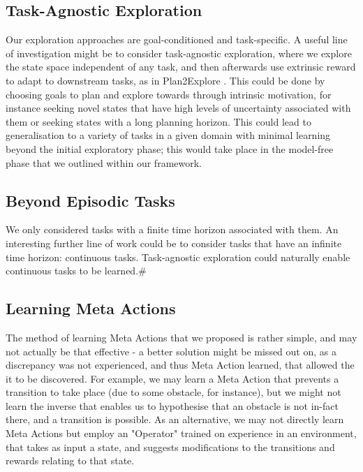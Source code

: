 \subsection{Task-Agnostic Exploration}
Our exploration approaches are goal-conditioned and task-specific. A useful line of investigation might be to consider task-agnostic exploration, where we explore the state space independent of any task, and then afterwards use extrinsic reward to adapt to downstream tasks, as in Plan2Explore \cite{plan2explore}. This could be done by choosing goals to plan and explore towards through intrinsic motivation, for instance seeking novel states that have high levels of uncertainty associated with them or seeking states with a long planning horizon. This could lead to generalisation to a variety of tasks in a given domain with minimal learning beyond the initial exploratory phase; this would take place in the model-free phase that we outlined within our framework.
\subsection{Beyond Episodic Tasks}
We only considered tasks with a finite time horizon associated with them. An interesting further line of work could be to consider tasks that have an infinite time horizon: continuous tasks. Task-agnostic exploration could naturally enable continuous tasks to be learned.#
\subsection{Learning Meta Actions}
The method of learning Meta Actions that we proposed is rather simple, and may not actually be that effective - a better solution might be missed out on, as a discrepancy was not experienced, and thus Meta Action learned, that allowed the it to be discovered. For example, we may learn a Meta Action that prevents a transition to take place (due to some obstacle, for instance), but we might not learn the inverse that enables us to hypothesise that an obstacle is not in-fact there, and a transition is possible. As an alternative, we may not directly learn Meta Actions but employ an "Operator" trained on experience in an environment, that takes as input a state, and suggests modifications to the transitions and rewards relating to that state.
